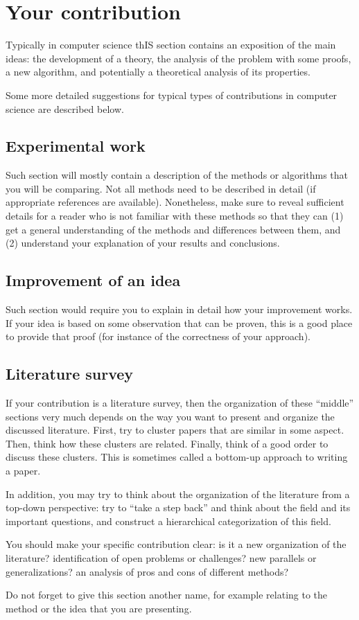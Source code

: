 \section{Your contribution}
Typically in computer science thIS section contains an exposition of the main ideas: the development of a theory, the analysis of the problem with some proofs, a new algorithm, and potentially a theoretical analysis of its properties.

Some more detailed suggestions for typical types of contributions in computer science are described below.

\subsection*{Experimental work}
Such section will mostly contain a description of the methods or algorithms that you will be comparing. Not all methods need to be described in detail (if appropriate references are available). Nonetheless, make sure to reveal sufficient details for a reader who is not familiar with these methods so that they can (1) get a general understanding of the methods and differences between them, and (2) understand your explanation of your results and conclusions.

\subsection*{Improvement of an idea}
Such section would require you to explain in detail how your improvement works. If your idea is based on some observation that can be proven, this is a good place to provide that proof (for instance of the correctness of your approach).

\subsection*{Literature survey}
If your contribution is a literature survey, then the organization of these ``middle'' sections very much depends on the way you want to present and organize the discussed literature. First, try to cluster papers that are similar in some aspect. Then, think how these clusters are related. Finally, think of a good order to discuss these clusters. This is sometimes called a bottom-up approach to writing a paper.

In addition, you may try to think about the organization of the literature from a top-down perspective: try to ``take a step back'' and think about the field and its important questions, and construct a hierarchical categorization of this field.

You should make your specific contribution clear: is it a new organization of the literature? identification of open problems or challenges? new parallels or generalizations? an analysis of pros and cons of different methods? 

Do not forget to give this section another name, for example relating to the method or the idea that you are presenting.